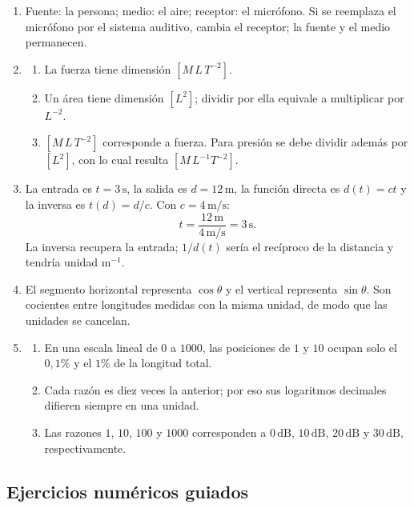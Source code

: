 \begin{enumerate}[label=\textbf{R\arabic*.},leftmargin=*]
    \item Fuente: la persona; medio: el aire; receptor: el micrófono. Si se reemplaza el micrófono por el sistema auditivo, cambia el receptor; la fuente y el medio permanecen.

    \item
    \begin{enumerate}[label=\alph*)]
        \item La fuerza tiene dimensión \([M\,L\,T^{-2}]\).
        \item Un área tiene dimensión \([L^{2}]\); dividir por ella equivale a multiplicar por \(L^{-2}\).
        \item \([M\,L\,T^{-2}]\) corresponde a fuerza. Para presión se debe dividir además por \([L^{2}]\), con lo cual resulta \([M\,L^{-1}T^{-2}]\).
    \end{enumerate}

    \item La entrada es \(t=3\,\text{s}\), la salida es \(d=12\,\text{m}\), la función directa es \(d(t)=ct\) y la inversa es \(t(d)=d/c\). Con \(c=4\,\text{m}/\text{s}\):
    \[
        t=\frac{12\,\text{m}}{4\,\text{m}/\text{s}}=3\,\text{s}.
    \]
    La inversa recupera la entrada; \(1/d(t)\) sería el recíproco de la distancia y tendría unidad \(\text{m}^{-1}\).

    \item El segmento horizontal representa \(\cos\theta\) y el vertical representa \(\sin\theta\). Son cocientes entre longitudes medidas con la misma unidad, de modo que las unidades se cancelan.

    \item
    \begin{enumerate}[label=\alph*)]
        \item En una escala lineal de \(0\) a \(1000\), las posiciones de \(1\) y \(10\) ocupan solo el \(0{,}1\%\) y el \(1\%\) de la longitud total.
        \item Cada razón es diez veces la anterior; por eso sus logaritmos decimales difieren siempre en una unidad.
        \item Las razones \(1\), \(10\), \(100\) y \(1000\) corresponden a \(0\,\text{dB}\), \(10\,\text{dB}\), \(20\,\text{dB}\) y \(30\,\text{dB}\), respectivamente.
    \end{enumerate}
\end{enumerate}

\subsection*{Ejercicios numéricos guiados}

